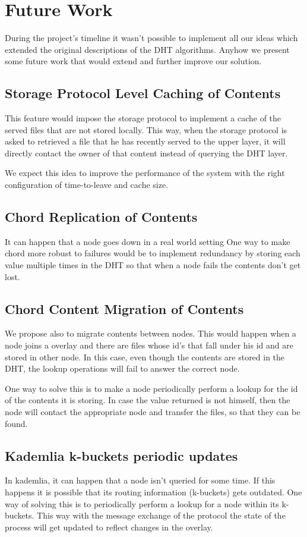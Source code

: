 \documentclass[sigconf]{acmart}
\begin{document}
\section{Future Work}\label{futureWork}
During the project's timeline it wasn't possible to implement all our ideas which extended the original descriptions of the DHT algorithms. Anyhow we present some future work that would extend and further improve our solution.

\subsection{Storage Protocol Level Caching of Contents}
This feature would impose the storage protocol to implement a cache of the served files that are not stored locally. This way, when the storage protocol is asked to retrieved a file that he has recently served to the upper layer, it will directly contact the owner of that content instead of querying the DHT layer.

We expect this idea to improve the performance of the system with the right configuration of time-to-leave and cache size. 

\subsection{Chord Replication of Contents}
It can happen that a node goes down in a real world setting
One way to make chord more robust to failures would be to implement redundancy by storing each value multiple times in the DHT so that when a node fails the contents don't get lost.

\subsection{Chord Content Migration of Contents}
We propose also to migrate contents between nodes. This would happen when a node joins a overlay and there are files whose id's that fall under his id and are stored in other node. In this case, even though the contents are stored in the DHT, the lookup operations will fail to answer the correct node.

One way to solve this is to make a node periodically perform a lookup for the id of the contents it is storing. In case the value returned is not himself, then the node will contact the appropriate node and transfer the files, so that they can be found.

\subsection{Kademlia k-buckets periodic updates}
In kademlia, it can happen that a node isn't queried for some time. If this happens it is possible that its routing information (k-buckets) gets outdated. One way of solving this is to periodically perform a lookup for a node within its k-buckets. This way with the message exchange of the protocol the state of the process will get updated to reflect changes in the overlay.
\end{document}
